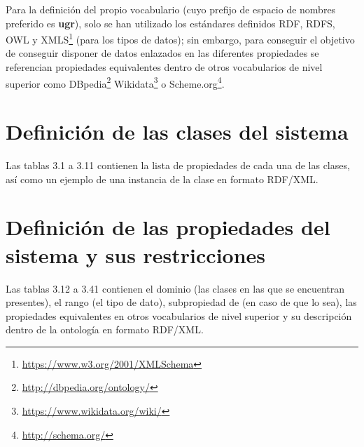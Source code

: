 Para la definición del propio vocabulario (cuyo prefijo de espacio de nombres preferido es \textbf{ugr}), solo se han utilizado los estándares definidos RDF, RDFS, OWL y XMLS\footnote{\url{https://www.w3.org/2001/XMLSchema}} (para los tipos de datos); sin embargo, para conseguir el objetivo de conseguir disponer de datos enlazados en las diferentes propiedades se referencian propiedades equivalentes dentro de otros vocabularios de nivel superior como DBpedia\footnote{\url{http://dbpedia.org/ontology/}} Wikidata\footnote{\url{https://www.wikidata.org/wiki/}} o Scheme.org\footnote{\url{http://schema.org/}}.

\section{Definición de las clases del sistema}

Las tablas 3.1 a 3.11 contienen la lista de propiedades de cada una de las clases, así como un ejemplo de una instancia de la clase en formato RDF/XML. 

\section{Definición de las propiedades del sistema y sus restricciones}

Las tablas 3.12 a 3.41 contienen el dominio (las clases en las que se encuentran presentes), el rango (el tipo de dato), subpropiedad de (en caso de que lo sea), las propiedades equivalentes en otros vocabularios de nivel superior y su descripción dentro de la ontología en formato RDF/XML.
\bigskip

